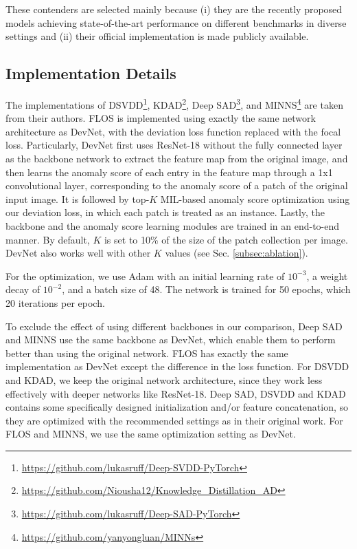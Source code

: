 \documentclass[10pt,journal,compsoc]{IEEEtran}
\begin{document}
These contenders are selected mainly because (i) they are the recently proposed models achieving state-of-the-art performance on different benchmarks in diverse settings and (ii) their official implementation is made publicly available.

\subsection{Implementation Details}

The implementations of DSVDD\footnote{\url{https://github.com/lukasruff/Deep-SVDD-PyTorch}}, KDAD\footnote{\url{https://github.com/Niousha12/Knowledge_Distillation_AD}}, Deep SAD\footnote{\url{https://github.com/lukasruff/Deep-SAD-PyTorch}}, and MINNS\footnote{\url{https://github.com/yanyongluan/MINNs}} are taken from their authors. FLOS is implemented using exactly the same network architecture as DevNet, with the deviation loss function replaced with the focal loss. Particularly, DevNet first uses ResNet-18 without the fully connected layer as the backbone network to extract the feature map from the original image, and then learns the anomaly score of each entry in the feature map through a 1x1 convolutional layer, corresponding to the anomaly score of a patch of the original input image. It is followed by top-$K$ MIL-based anomaly score optimization using our deviation loss, in which each patch is treated as an instance. Lastly, the backbone and the anomaly score learning modules are trained in an end-to-end manner. By default, $K$ is set to 10\% of the size of the patch collection per image. DevNet also works well with other $K$ values (see Sec. \ref{subsec:ablation}).

For the optimization, we use Adam \cite{kingma2014adam} with an initial learning rate of $10^{-3}$, a weight decay of $10^{-2}$, and a batch size of 48. The network is trained for 50 epochs, which 20 iterations per epoch.

To exclude the effect of using different backbones in our comparison, Deep SAD and MINNS use the same backbone as DevNet, which enable them to perform better than using the original network. FLOS has exactly the same implementation as DevNet except the difference in the loss function. For DSVDD and KDAD, we keep the original network architecture, since they work less effectively with deeper networks like ResNet-18. Deep SAD, DSVDD and KDAD contains some specifically designed initialization and/or feature concatenation, so they are optimized with the recommended settings as in their original work. For FLOS and MINNS, we use the same optimization setting as DevNet. 
\end{document}

